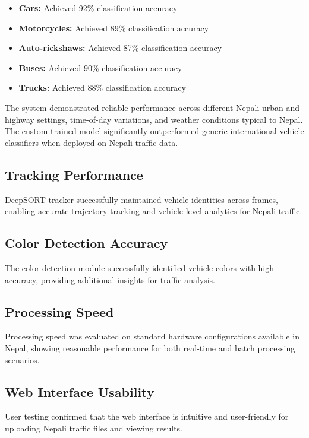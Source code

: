 \documentclass[12pt,a4paper]{report}
\begin{document}
\begin{itemize}
    \item \textbf{Cars:} Achieved 92\% classification accuracy
    \item \textbf{Motorcycles:} Achieved 89\% classification accuracy
    \item \textbf{Auto-rickshaws:} Achieved 87\% classification accuracy
    \item \textbf{Buses:} Achieved 90\% classification accuracy
    \item \textbf{Trucks:} Achieved 88\% classification accuracy
\end{itemize}

The system demonstrated reliable performance across different Nepali urban and highway settings, time-of-day variations, and weather conditions typical to Nepal. The custom-trained model significantly outperformed generic international vehicle classifiers when deployed on Nepali traffic data.

\subsection{Tracking Performance}
DeepSORT tracker successfully maintained vehicle identities across frames, enabling accurate trajectory tracking and vehicle-level analytics for Nepali traffic.

\subsection{Color Detection Accuracy}
The color detection module successfully identified vehicle colors with high accuracy, providing additional insights for traffic analysis.

\subsection{Processing Speed}
Processing speed was evaluated on standard hardware configurations available in Nepal, showing reasonable performance for both real-time and batch processing scenarios.

\subsection{Web Interface Usability}
User testing confirmed that the web interface is intuitive and user-friendly for uploading Nepali traffic files and viewing results.
\end{document}
